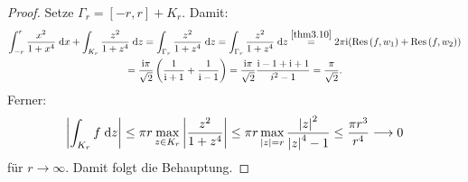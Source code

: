 \documentclass[a4paper,twoside,DIV15,BCOR12mm]{scrbook}
\begin{document}
\begin{bsp}
\begin{proof}
Setze $\Gamma_r = [-r,r]+K_r$. Damit:
\begin{gather*}
\int_{-r}^{r}{\frac{x^2}{1+x^4}}\;\mathrm{d} x + \int_{K_r}^{}{\frac{z^2}{1+z^4}}\;\mathrm{d} z = \int_{\Gamma_r}^{}{\frac{z^2}{1+z^4}}\;\mathrm{d} z = \int_{\Gamma_r}^{}{\frac{z^2}{1+z^4}}\;\mathrm{d} z \overset{\ref{thm3.10}}{=}2\pi\mathrm{i}(\mathrm{Res}\left(f,w_1\right)+\mathrm{Res}\left(f,w_2\right))\\
=\frac{\mathrm{i}\pi}{\sqrt{2}}\left(\frac{1}{\mathrm{i}+1}+\frac{1}{\mathrm{i}-1}\right) = \frac{\mathrm{i}\pi}{\sqrt{2}}\frac{\mathrm{i}-1+\mathrm{i}+1}{i^2-1}=\frac{\pi}{\sqrt{2}}.
\end{gather*}
Ferner:
\[\left\lvert\int_{K_r}^{}{f}\;\mathrm{d} z\right\lvert\leq\pi r\max_{z\in K_r}\left\lvert\frac{z^2}{1+z^4}\right\lvert\leq\pi r\max_{\left\lvert z\right\lvert=r}\frac{\left\lvert z\right\lvert^2}{\left\lvert z\right\lvert^4-1}\leq\frac{\pi r^3}{r^4}\longrightarrow 0\]
für $r\to\infty$. Damit folgt die Behauptung.
\end{proof}
\end{bsp}
\end{document}
